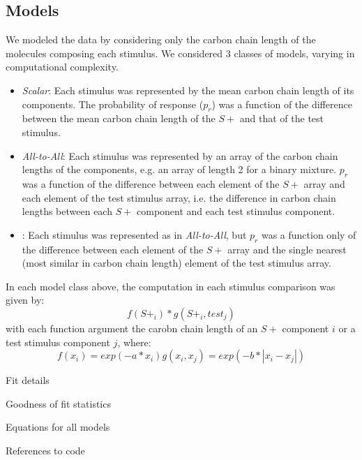\subsection*{Models}
\label{sec:methods_models}

We modeled the data by considering only the carbon chain length of the molecules composing each stimulus.  
We considered 3 classes of models, varying in computational complexity.  
\begin{itemize}
\item \textit{Scalar}: Each stimulus was represented by the mean carbon chain length of its components.  The probability of response ($p_r$) was a function of the difference between the mean carbon chain length of the $S+$ and that of the test stimulus.  
\item \textit{All-to-All}: Each stimulus was represented by an array of the carbon chain lengths of the components, e.g. an array of length 2 for a binary mixture. $p_r$ was a function of the difference between each element of the $S+$ array and each element of the test stimulus array, i.e. the difference in carbon chain lengths between each $S+$ component and each test stimulus component.  
\item {}: Each stimulus was represented as in \textit{All-to-All}, but $p_r$ was a function only of the difference between each element of the $S+$ array and the single nearest (most similar in carbon chain length) element of the test stimulus array.  
\end{itemize}

In each model class above, the computation in each stimulus comparison was given by: 
\begin{equation}
f(S+_i) * g(S+_i,test_j)
\end{equation}
with each function argument the carobn chain length of an $S+$ component $i$ or a test stimulus component $j$, where:
\begin{equation}
f(x_i) = exp(-a*x_i)
g(x_i,x_j) = exp(-b*|x_i-x_j|)
\end{equation}

\item Fit details
\item Goodness of fit statistics
\item Equations for all models
\item References to code

